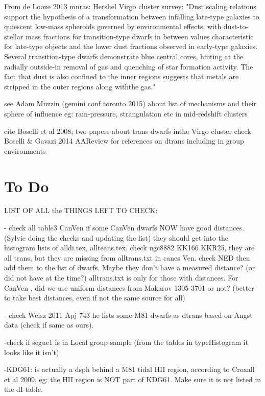 \documentclass[12pt,preprint]{emulateapj}
\begin{document}
From de Looze 2013 mnras: Hershel Virgo cluster survey: "Dust scaling relations support the hypothesis of a transformation 
between infalling late-type galaxies to quiescent low-mass spheroids governed by environmental effects, with 
dust-to-stellar mass fractions for transition-type dwarfs in between values characteristic for late-type objects and 
the lower dust fractions observed in early-type galaxies. Several transition-type dwarfs demonstrate blue central cores, 
hinting at the radially outside-in removal of gas and quenching of star formation activity. The fact that dust is also 
confined to the inner regions suggests that metals are stripped in the outer regions along withthe gas."

see Adam Muzzin (gemini conf toronto 2015) about list of mechanisms and their sphere of influence eg: ram-pressure, strangulation etc in mid-redshift clusters

cite Boselli et al 2008, two papers about trans dwarfs inthe Virgo cluster
check Boselli \& Gavazi 2014 AAReview for references on dtrans including in group environments



\section{To Do}

LIST OF ALL the THINGS LEFT TO CHECK:

- check all table3 CanVen if some CanVen dwarfs NOW have good distances. (Sylvie doing the checks and updating the list) they should get into 
the histogram lists of alldi.tex, allteans.tex. check ugc8882 KK166 KKR25, they are all trans, but they are missing from alltrans.txt in canes Ven. 
check NED then add them to the list of dwarfs. Maybe they don't have a measured distance? (or did not have at the time?) alltrans.txt is only for 
those with distances. For CanVen , did we use uniform distances from Makarov 1305-3701 or not? (better to take best distances, even if not the 
same source for all)

- check Weisz 2011 Apj 743 he lists some M81 dwarfs as dtrans based on Angst data (check if same as ours).

-check if segue1 is in Local group sample (from the tables in typeHistogram it looks like it isn't)

-KDG61: is actually a dsph behind a M81 tidal HII region, according to Croxall et al 2009, eg: the HII region is NOT part of KDG61. Make sure it is not listed in the dI table.
\end{document}
